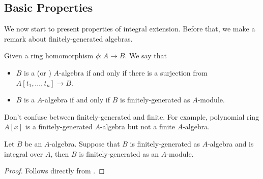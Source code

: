 \subsection{Basic Properties}
We now start to present properties of integral extension.
Before that, we make a remark about finitely-generated algebras. 
\begin{definition}
    Given a ring homomorphism $\phi : A\to B$.
    We say that 
    \begin{itemize}
    \item $B$ is a 
    (or ) $A$-algebra
    if and only if there is a surjection from
    $A[t_1,\dots,t_n]\to B$.
    \item $B$ is a  $A$-algebra
    if and only if $B$ is finitely-generated as $A$-module.
    \end{itemize}
\end{definition}
\begin{warn}
Don't confuse between finitely-generated and finite.
For example, polynomial ring $A[x]$ 
is a finitely-generated $A$-algebra but not a finite $A$-algebra.
\end{warn}
\begin{corollary}
    \label{cor:integral_finite_generation}
    Let $B$ be an $A$-algebra.
    Suppose that $B$ is finitely-generated
    as $A$-algebra and is integral over $A$,
    then $B$ is finitely-generated as an $A$-module.
\end{corollary}
\begin{proof}
    Follows directly from .
\end{proof}
